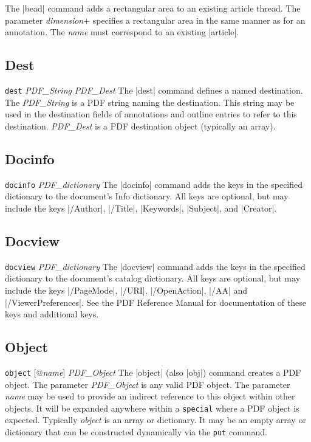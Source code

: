 {\description
The |bead| command adds a rectangular area to an existing article thread.
The parameter {\it dimension}+ specifies a rectangular area
in the same manner as for an annotation.  The {\it name}
must correspond to an existing |article|.
\example
\begintt
{}
\endtt

\subsection{Dest}
\syntax
{\tt dest} {\it PDF\_String} {\it PDF\_Dest}
\description
The |dest| command defines a named destination.
The {\it PDF\_String} is a PDF string naming
the destination.  This string may be used in the destination
fields of annotations and outline entries to refer to
this destination.  {\it PDF\_Dest} is a PDF
destination object (typically an array).
\example
\begintt
{}
\endtt

\subsection{Docinfo}
\syntax
{\tt docinfo} {\it PDF\_dictionary}
\description
The |docinfo| command adds the keys in the specified dictionary to the
document's Info dictionary.  All keys are optional, but may include
the keys |/Author|, |/Title|, |Keywords|, |Subject|,
and |Creator|.
\example
\begintt
{}
\endtt

\subsection{Docview}
\syntax
{\tt docview} {\it PDF\_dictionary}
\description
The |docview| command adds the keys in the specified dictionary to the
document's catalog dictionary.  All keys are optional, but may include
the keys |/PageMode|,
|/URI|, |/OpenAction|, |/AA|
and |/ViewerPreferences|.  See the PDF Reference Manual
for documentation of these keys and additional keys.
\example
\begintt
{}
\endtt


\subsection{Object}
\syntax
{\tt object} [@{\it name}] {\it PDF\_Object}
\description
The |object| (also |obj|) command creates a
PDF object.  The parameter {\it PDF\_Object} is any valid PDF object.  The
parameter {\it name} may be used to provide an indirect reference
to this object within other
objects. It will be expanded anywhere within
a {\tt special} where a PDF object is
expected. Typically {\it object} is an array
or dictionary.  It may be an empty array or
dictionary that can be constructed dynamically via
the {\tt put} command.
\example
\begintt
{}
\endtt

}

